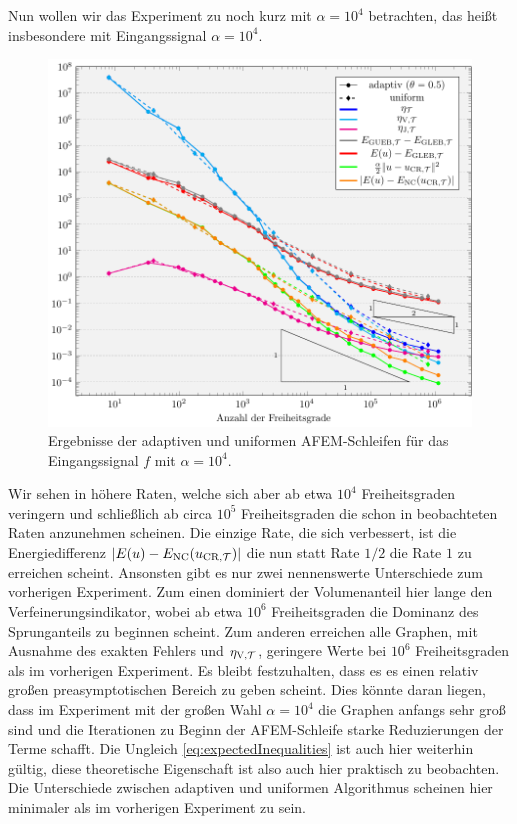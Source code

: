Nun wollen wir das Experiment zu  noch kurz mit
$\alpha=10^4$ betrachten, das heißt insbesondere mit Eingangssignal
$\alpha=10^4$.
\begin{figure}[p]
  \centering
  \includegraphics[width=\linewidth]
    {pictures/chapExperiments/secExactSol/f01LargeAlpha/conv.pdf}
  \caption{Ergebnisse der adaptiven und uniformen AFEM-Schleifen für das 
  Eingangssignal $f$ mit $\alpha=10^4$.}
  \label{fig:f01LargeAlphaConvergence}
\end{figure}
Wir sehen in  höhere Raten, welche sich 
aber ab etwa $10^4$ Freiheitsgraden veringern und schließlich ab 
circa $10^5$ Freiheitsgraden die schon in  
beobachteten Raten anzunehmen scheinen. 
Die einzige Rate, die sich verbessert, ist die Energiedifferenz
$|E(u)-E_\textup{NC}(u_{\textup{CR}, \mathcal{T}})|$ die nun statt Rate $1/2$ die Rate $1$ zu erreichen
scheint.
Ansonsten gibt es nur zwei nennenswerte Unterschiede zum vorherigen Experiment.
Zum einen dominiert der Volumenanteil hier lange den Verfeinerungsindikator, 
wobei ab etwa $10^6$ Freiheitsgraden die Dominanz des Sprunganteils zu 
beginnen scheint. 
Zum anderen erreichen alle Graphen, mit Ausnahme des exakten Fehlers und
$\eta_{\textup{V}, \mathcal{T}}$,  geringere Werte bei $10^6$ Freiheitsgraden als im vorherigen
Experiment.
Es bleibt festzuhalten, dass es es einen relativ großen preasymptotischen
Bereich zu geben scheint.  
Dies könnte daran liegen, dass im Experiment mit der großen Wahl $\alpha=10^4$
die Graphen anfangs sehr groß sind und die Iterationen zu Beginn der
AFEM-Schleife starke Reduzierungen der Terme schafft.
Die Ungleich \eqref{eq:expectedInequalities} ist auch hier weiterhin gültig,
diese theoretische Eigenschaft ist also auch hier praktisch zu beobachten.
Die Unterschiede zwischen adaptiven und uniformen Algorithmus scheinen hier
minimaler als im vorherigen Experiment zu sein.

